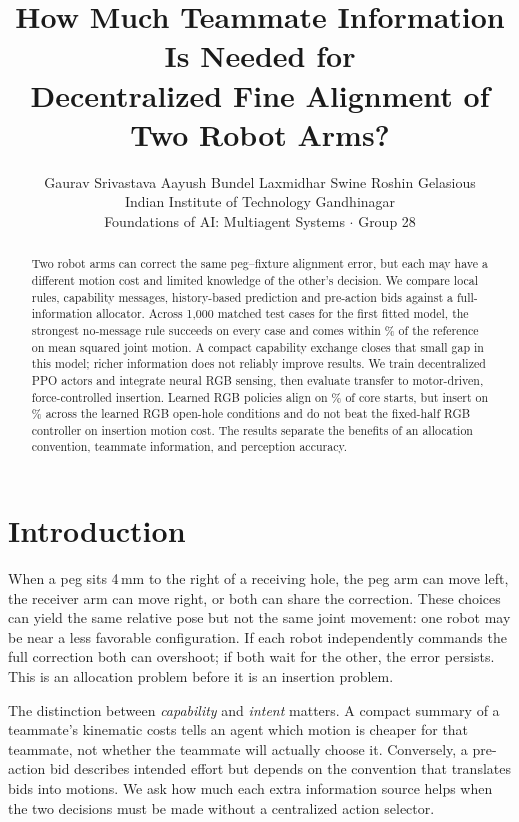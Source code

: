 \documentclass{article}
\title{How Much Teammate Information Is Needed for\texorpdfstring{\\}{ }Decentralized Fine Alignment of Two Robot Arms?}
\author{Gaurav Srivastava \quad Aayush Bundel \quad Laxmidhar Swine \quad Roshin Gelasious\\[.4em]
Indian Institute of Technology Gandhinagar\\
Foundations of AI: Multiagent Systems \enspace $\cdot$ \enspace Group 28}
\begin{document}
\maketitle
\thispagestyle{empty}
\begin{abstract}
Two robot arms can correct the same peg--fixture alignment error, but each may have a different motion cost and limited knowledge of the other's decision. We compare local rules, capability messages, history-based prediction and pre-action bids against a full-information allocator. Across 1,000 matched test cases for the first fitted model, the strongest no-message rule succeeds on every case and comes within \LocalGap\% of the reference on mean squared joint motion. A compact capability exchange closes that small gap in this model; richer information does not reliably improve results. We train decentralized PPO actors and integrate neural RGB sensing, then evaluate transfer to motor-driven, force-controlled insertion. Learned RGB policies align on \RgbAlignRange\% of core starts, but insert on \LearnedContactRange\% across the learned RGB open-hole conditions and do not beat the fixed-half RGB controller on insertion motion cost. The results separate the benefits of an allocation convention, teammate information, and perception accuracy.
\end{abstract}

\section{Introduction}
When a peg sits 4\,mm to the right of a receiving hole, the peg arm can move left, the receiver arm can move right, or both can share the correction. These choices can yield the same relative pose but not the same joint movement: one robot may be near a less favorable configuration. If each robot independently commands the full correction both can overshoot; if both wait for the other, the error persists. This is an allocation problem before it is an insertion problem.

The distinction between \emph{capability} and \emph{intent} matters. A compact summary of a teammate's kinematic costs tells an agent which motion is cheaper for that teammate, not whether the teammate will actually choose it. Conversely, a pre-action bid describes intended effort but depends on the convention that translates bids into motions. We ask how much each extra information source helps when the two decisions must be made without a centralized action selector.
\end{document}
